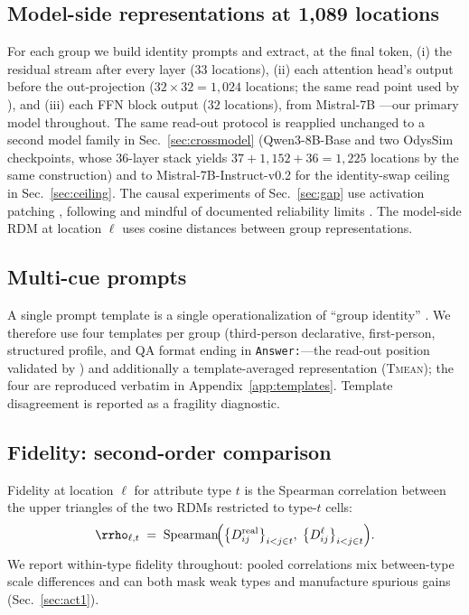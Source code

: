 \subsection{Model-side representations at 1{,}089 locations}
For each group we build identity prompts and extract, at the final token,
(i) the residual stream after every layer ($33$ locations), (ii) each
attention head's output before the out-projection
($32\times32=1{,}024$ locations; the same read point used by
\citealp{llmopinions2026}), and (iii) each FFN block output ($32$
locations), from Mistral-7B \citep{mistral7b}---our primary model
throughout. The same read-out protocol is reapplied unchanged to a second
model family in Sec.~\ref{sec:crossmodel} (Qwen3-8B-Base and two OdysSim
checkpoints, whose 36-layer stack yields $37+1{,}152+36=1{,}225$
locations by the same construction) and to Mistral-7B-Instruct-v0.2 for
the identity-swap ceiling in Sec.~\ref{sec:ceiling}. The causal
experiments of Sec.~\ref{sec:gap} use activation patching
\citep{meng2022rome, wang2023ioi}, following \citet{heimersheim2024} and
mindful of documented reliability limits \citep{causalprobing2025}. The
model-side RDM at
location $\ell$ uses cosine distances between group representations.

\subsection{Multi-cue prompts}
A single prompt template is a single operationalization of ``group
identity'' \citep{constructvalidity2026}. We therefore use four templates
per group (third-person declarative, first-person, structured profile,
and QA format ending in \texttt{Answer:}---the read-out position validated
by \citealp{llmopinions2026}) and additionally a template-averaged
representation (\textsc{Tmean}); the four are reproduced verbatim in
Appendix~\ref{app:templates}. Template disagreement is reported as a
fragility diagnostic.

\subsection{Fidelity: second-order comparison}
Fidelity at location $\ell$ for attribute type $t$ is the Spearman
correlation between the upper triangles of the two RDMs restricted to
type-$t$ cells:
\begin{equation}
\rrho_{\ell,t} \;=\; \mathrm{Spearman}\!\Big(
\big\{D^{\mathrm{real}}_{ij}\big\}_{i<j\in t},\;
\big\{D^{\ell}_{ij}\big\}_{i<j\in t}\Big).
\end{equation}
We report within-type fidelity throughout: pooled correlations mix
between-type scale differences and can both mask weak types and
manufacture spurious gains (Sec.~\ref{sec:act1}).

